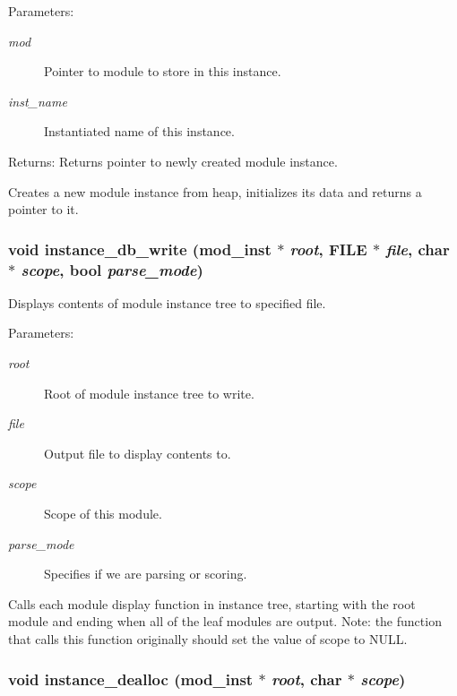 \begin{Desc}
\item[Parameters:]
\begin{description}
\item[{\em mod}]Pointer to module to store in this instance. \item[{\em inst\_\-name}]Instantiated name of this instance.\end{description}
\end{Desc}
\begin{Desc}
\item[Returns:]Returns pointer to newly created module instance.\end{Desc}
Creates a new module instance from heap, initializes its data and returns a pointer to it. 
\subsubsection{\setlength{\rightskip}{0pt plus 5cm}void instance\_\-db\_\-write ({\bf mod\_\-inst} $\ast$ {\em root}, FILE $\ast$ {\em file}, char $\ast$ {\em scope}, {\bf bool} {\em parse\_\-mode})}\label{instance_8c_a10}


Displays contents of module instance tree to specified file.

\begin{Desc}
\item[Parameters:]
\begin{description}
\item[{\em root}]Root of module instance tree to write. \item[{\em file}]Output file to display contents to. \item[{\em scope}]Scope of this module. \item[{\em parse\_\-mode}]Specifies if we are parsing or scoring.\end{description}
\end{Desc}
Calls each module display function in instance tree, starting with the root module and ending when all of the leaf modules are output. Note: the function that calls this function originally should set the value of scope to NULL. 
\subsubsection{\setlength{\rightskip}{0pt plus 5cm}void instance\_\-dealloc ({\bf mod\_\-inst} $\ast$ {\em root}, char $\ast$ {\em scope})}\label{instance_8c_a12}


